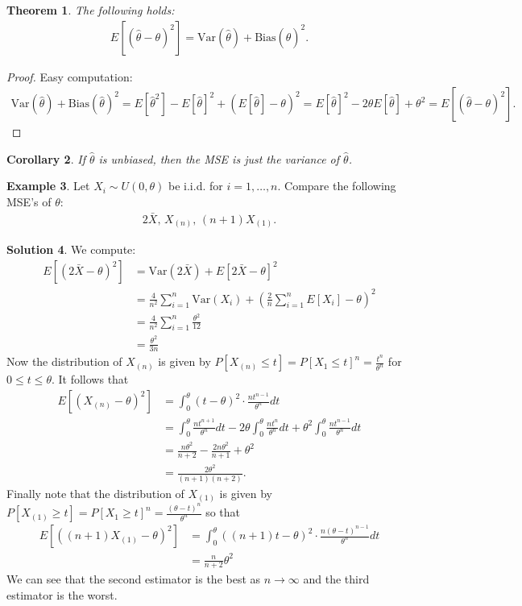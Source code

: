 \documentclass[11pt]{amsart}
\newtheorem{theorem}{Theorem}[section]
\newtheorem{corollary}[theorem]{Corollary}
\theoremstyle{definition}
\newtheorem{example}[theorem]{Example}
\newtheorem{solution}[theorem]{Solution}
\numberwithin{equation}{section}
\begin{document}
\begin{theorem}
    The following holds:
    \begin{align*}
        E[(\hat\theta-\theta)^2]=\mathrm{Var}(\hat\theta)+\mathrm{Bias}(\hat\theta)^2.
    \end{align*}
\end{theorem}
\begin{proof}
    Easy computation:
    \begin{align*}
        \mathrm{Var}(\hat\theta)+\mathrm{Bias}(\hat\theta)^2=E[\hat\theta^2]-E[\hat\theta]^2+(E[\hat\theta]-\theta)^2=E[\hat\theta]^2-2\theta E[\hat\theta]+\theta^2=E[(\hat\theta-\theta)^2].
    \end{align*}
\end{proof}
\begin{corollary}
    If $\hat\theta$ is unbiased, then the MSE is just the variance of $\hat\theta$.
\end{corollary}
\begin{example}
    Let $X_i\sim U(0,\theta)$ be i.i.d. for $i=1,\ldots,n$. Compare the following MSE's of $\theta$:
    \begin{align*}
        2\bar X,\,X_{(n)},\,(n+1)X_{(1)}.
    \end{align*}
\end{example}
\addtocounter{theorem}{-1}
\begin{solution}
    We compute:
    \begin{align*}
        E[(2\bar X-\theta)^2]&=\mathrm{Var}(2\bar X)+E[2\bar X-\theta]^2\\
        &=\frac{4}{n^2}\sum_{i=1}^n\mathrm{Var}(X_i)+(\frac{2}{n}\sum_{i=1}^nE[X_i]-\theta)^2\\
        &=\frac{4}{n^2}\sum_{i=1}^n\frac{\theta^2}{12}\\
        &=\frac{\theta^2}{3n}
    \end{align*}
    Now the distribution of $X_{(n)}$ is given by $P[X_{(n)}\le t]=P[X_1\le t]^n=\frac{t^n}{\theta^n}$ for $0\le t\le \theta$. It follows that
    \begin{align*}
        E[(X_{(n)}-\theta)^2]&=\int_0^\theta (t-\theta)^2\cdot\frac{nt^{n-1}}{\theta^n}dt\\
        &=\int_{0}^\theta\frac{nt^{n+1}}{\theta^n}dt-2\theta\int_0^\theta\frac{nt^n}{\theta^n}dt+\theta^2\int_0^\theta\frac{nt^{n-1}}{\theta^n}dt\\
        &=\frac{n\theta^2}{n+2}-\frac{2n\theta^2}{n+1}+\theta^2\\
        &=\frac{2\theta^2}{(n+1)(n+2)}.
    \end{align*}
    Finally note that the distribution of $X_{(1)}$ is given by $P[X_{(1)}\ge t]=P[X_1\ge t]^n=\frac{(\theta-t)^n}{\theta^n}$ so that
    \begin{align*}
        E[((n+1)X_{(1)}-\theta)^2]&=\int_0^\theta((n+1)t-\theta)^2\cdot\frac{n(\theta-t)^{n-1}}{\theta^n}dt\\
        &=\frac{n}{n+2}\theta^2
    \end{align*}
    We can see that the second estimator is the best as $n\to\infty$ and the third estimator is the worst.
\end{solution}
\end{document}
